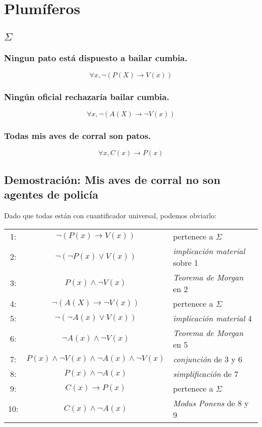 \section{Plumíferos}
\subsection{$\Sigma$}

\subsubsection{Ningun pato está dispuesto a bailar cumbia.}
\begin{equation}
\forall x, \neg (P(X) \rightarrow V(x))
\end{equation}\label{PRED:2}

\subsubsection{Ningún oficial rechazaría bailar cumbia.}
\begin{equation}
\forall x, \neg(A(X) \rightarrow \neg V(x))
\end{equation}\label{PRED:2}


\subsubsection{Todas mis aves de corral son patos.} 
\begin{equation}
\forall x, C(x)  \rightarrow P(x)
\end{equation}\label{PRED:3}

\subsection{Demostración: Mis aves de corral no son agentes de policía}
Dado que todas están con cuantificador universal, podemos obviarlo:\\

\begin{tabular}{ c  c  l }
1:& $\neg (P(x) \rightarrow V(x))$ & pertenece a $\Sigma$\\
2:& $\neg (\neg P(x) \vee V(x))$ & \textit{implicación material} sobre 1\\
3:& $P(x) \wedge \neg V(x)$ & \textit{Teorema de Morgan} en 2\\
4:& $\neg(A(X) \rightarrow \neg V(x))$ & pertenece a $\Sigma$\\
5:& $\neg (\neg A(x) \vee V(x))$ & \textit{implicación material} 4\\
6:& $\neg A(x) \wedge \neg V(x)$ & \textit{Teorema de Morgan} en 5\\
7:& $P(x) \wedge \neg V(x) \wedge \neg A(x) \wedge \neg V(x)$ & \textit{conjunción} de 3 y 6\\
8:& $P(x) \wedge \neg A(x)$ & \textit{simplificación} de 7\\
9:& $C(x)  \rightarrow P(x)$ & pertenece a $\Sigma$\\
10:& $C(x)  \wedge \neg A(x)$ & \textit{Modus Ponens} de 8 y 9\\
\end{tabular}

